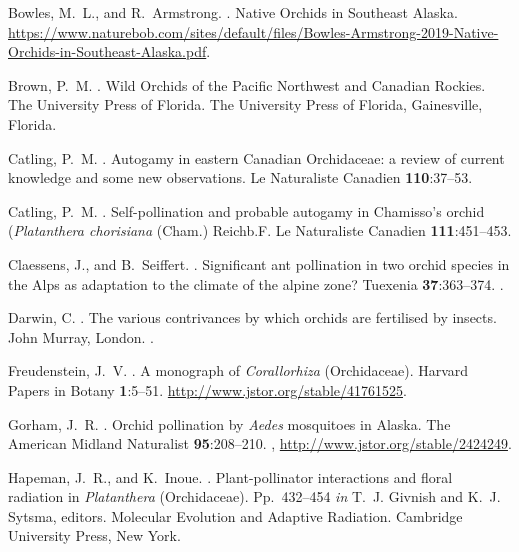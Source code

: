 \begin{multicols}{2}
\begin{thebibliography}{28}
Bowles, M.~L., and R.~Armstrong.
.
\newblock Native Orchids in Southeast Alaska.
\newblock
  \urlprefix\url{https://www.naturebob.com/sites/default/files/Bowles-Armstrong-2019-Native-Orchids-in-Southeast-Alaska.pdf}.

Brown, P.~M.
.
\newblock Wild Orchids of the Pacific Northwest and Canadian Rockies. The
  University Press of Florida.
\newblock The University Press of Florida, Gainesville, Florida.

Catling, P.~M.
.
\newblock Autogamy in eastern Canadian Orchidaceae: a review of current
  knowledge and some new observations.
\newblock Le Naturaliste Canadien {\bfseries 110}:37--53.

Catling, P.~M.
.
\newblock Self-pollination and probable autogamy in Chamisso's orchid
  (\emph{Platanthera chorisiana} (Cham.) Reichb.F.
\newblock Le Naturaliste Canadien {\bfseries 111}:451--453.

Claessens, J., and B.~Seiffert.
.
\newblock Significant ant pollination in two orchid species in the Alps as
  adaptation to the climate of the alpine zone?
\newblock Tuexenia {\bfseries 37}:363--374.
\newblock {}.

Darwin, C.
.
\newblock The various contrivances by which orchids are fertilised by insects.
\newblock John Murray, London.
\newblock {}.

Freudenstein, J.~V.
.
\newblock A monograph of \emph{Corallorhiza} (Orchidaceae).
\newblock Harvard Papers in Botany {\bfseries 1}:5--51.
\newblock \urlprefix\url{http://www.jstor.org/stable/41761525}.

Gorham, J.~R.
.
\newblock Orchid pollination by \emph{Aedes} mosquitoes in {Alaska}.
\newblock The American Midland Naturalist {\bfseries 95}:208--210.
\newblock {},
  \urlprefix\url{http://www.jstor.org/stable/2424249}.

Hapeman, J.~R., and K.~Inoue.
.
\newblock Plant-pollinator interactions and floral radiation in
  \textit{Platanthera} (Orchidaceae).
\newblock Pp.\ 432--454 {\em in\/} T.~J. Givnish and K.~J. Sytsma, editors.
  Molecular Evolution and Adaptive Radiation. Cambridge University Press, New
  York.


\end{thebibliography}
\end{multicols}
